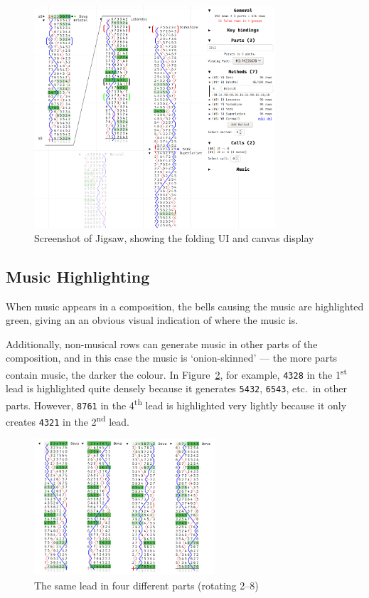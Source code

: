 \documentclass[12pt]{article}
\newcommand{\row}[1]{\texttt{#1}}
\newcommand{\nth}[2]{#1\textsuperscript{#2}}
\begin{document}
\begin{figure}
    \centering
    \includegraphics[width=0.8\textwidth]{current-screenshot-w-mute}
    \caption{Screenshot of Jigsaw, showing the folding UI and canvas display}\label{fig:cur-screenshot}
\end{figure}

\subsection{Music Highlighting}

When music appears in a composition, the bells causing the music are highlighted green, giving an
an obvious visual indication of where the music is.

Additionally, non-musical rows can generate music in other parts of the composition, and in this
case the music is `onion-skinned' --- the more parts contain music, the darker the colour.  In
Figure~\ref{fig:multi-part-music}, for example, \row{4328} in the \nth{1}{st} lead is highlighted quite
densely because it generates \row{5432}, \row{6543}, etc.\ in other parts.  However, \row{8761} in
the \nth{4}{th} lead is highlighted very lightly because it only creates \row{4321} in the \nth{2}{nd}
lead.

\begin{figure}
    \centering
    \includegraphics[width=0.6\textwidth]{multi-part-music-clean}
    \caption{The same lead in four different parts (rotating 2--8)}\label{fig:multi-part-music}
\end{figure}
\end{document}
